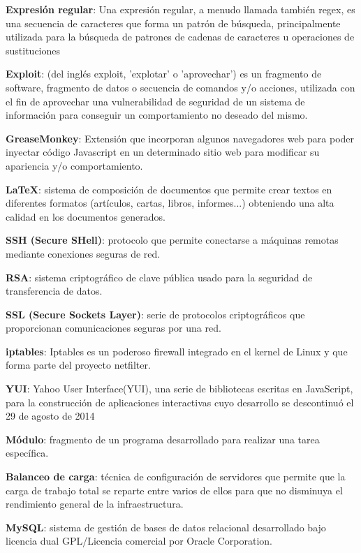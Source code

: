 \textbf{Expresión regular}: Una expresión regular, a menudo llamada también regex, es una secuencia de caracteres que forma un patrón de búsqueda, principalmente utilizada para la búsqueda de patrones de cadenas de caracteres u operaciones de sustituciones
\bigskip

\textbf{Exploit}: (del inglés exploit, 'explotar' o 'aprovechar') es un fragmento de software, fragmento de datos o secuencia de comandos y/o acciones, utilizada con el fin de aprovechar una vulnerabilidad de seguridad de un sistema de información para conseguir un comportamiento no deseado del mismo.
\bigskip

\textbf{GreaseMonkey}: Extensión que incorporan algunos navegadores web para poder inyectar código Javascript en un determinado sitio web para modificar su apariencia y/o comportamiento.
\bigskip

\textbf{LaTeX}: sistema de composición de documentos que permite crear textos en diferentes formatos (artículos, cartas, libros, informes...) obteniendo una alta calidad en los documentos generados.
\bigskip


\textbf{SSH (Secure SHell)}: protocolo que permite conectarse a máquinas remotas mediante conexiones seguras de red.
\bigskip

\textbf{RSA}: sistema criptográfico de clave pública usado para la seguridad de transferencia de datos.
\bigskip

\textbf{SSL (Secure Sockets Layer)}: serie de protocolos criptográficos que proporcionan comunicaciones seguras por una red.
\bigskip


\textbf{iptables}: Iptables es un poderoso firewall integrado en el kernel de Linux y que forma parte del proyecto netfilter.
\bigskip





\textbf{YUI}: Yahoo User Interface(YUI), una serie de bibliotecas escritas en JavaScript, para la construcción de aplicaciones interactivas cuyo desarrollo se descontinuó el 29 de agosto de 2014



\textbf{Módulo}: fragmento de un programa desarrollado para realizar una tarea específica.
\bigskip

\textbf{Balanceo de carga}: técnica de configuración de servidores que permite que la carga de trabajo total se reparte entre varios de ellos para que no disminuya el rendimiento general de la infraestructura.
\bigskip


\textbf{MySQL}: sistema de gestión de bases de datos relacional desarrollado bajo licencia dual GPL/Licencia comercial por Oracle Corporation.
\bigskip

